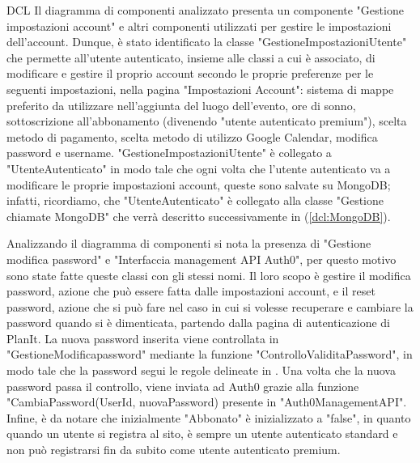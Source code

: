 \begin{listaPersonale}{DCL}
    Il diagramma di componenti analizzato presenta un componente "Gestione impostazioni account" e altri componenti utilizzati per gestire le impostazioni dell'account. Dunque, è stato identificato la classe "GestioneImpostazioniUtente" che permette all'utente autenticato, insieme alle classi a cui è associato, di modificare e gestire il proprio account secondo le proprie preferenze per le seguenti impostazioni, nella pagina "Impostazioni Account": sistema di mappe preferito da utilizzare nell'aggiunta del luogo dell'evento, ore di sonno, sottoscrizione all'abbonamento (divenendo "utente autenticato premium"), scelta metodo di pagamento, scelta metodo di utilizzo Google Calendar, modifica password e username.
    "GestioneImpostazioniUtente" è collegato a "UtenteAutenticato" in modo tale che ogni volta che l'utente autenticato va a modificare le proprie impostazioni account, queste sono salvate su MongoDB; infatti, ricordiamo, che "UtenteAutenticato" è collegato alla classe "Gestione chiamate MongoDB" che verrà descritto successivamente in (\ref{dcl:MongoDB}).
    \begin{center}
        
    \end{center}
    \newpage


    \begin{listaPersonale2}[DCL]{}

        Analizzando il diagramma di componenti si nota la presenza di "Gestione modifica password" e "Interfaccia management API Auth0", per questo motivo sono state fatte queste classi con gli stessi nomi. Il loro scopo è gestire il modifica password, azione che può essere fatta dalle impostazioni account, e il reset password, azione che si può fare nel caso in cui si volesse recuperare e cambiare la password quando si è dimenticata, partendo dalla pagina di autenticazione di PlanIt. La nuova password inserita viene controllata in "GestioneModificapassword" mediante la funzione "ControlloValiditaPassword", in modo tale che la password segui le regole delineate in . Una volta che la nuova password passa il controllo, viene inviata ad Auth0 grazie alla funzione "CambiaPassword(UserId, nuovaPassword) presente in "Auth0ManagementAPI".
        Infine, è da notare che inizialmente "Abbonato" è inizializzato a "false", in quanto quando un utente si registra al sito, è sempre un utente autenticato standard e non può registrarsi fin da subito come utente autenticato premium.



\end{listaPersonale2}
\end{listaPersonale}
